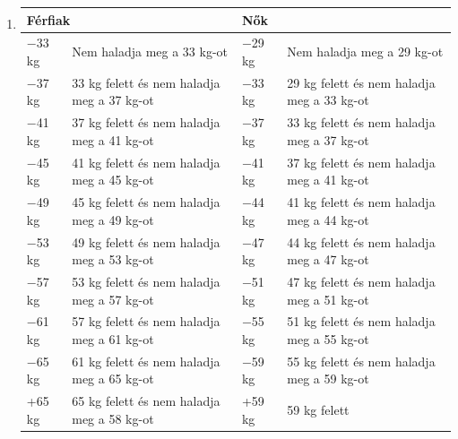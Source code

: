 \documentclass[]{report}
\begin{document}
\begin{enumerate}
\newpage
\item

\begin{center}
\begin{tabular}{ |l|l|l|l| }
 \hline
 \multicolumn{2}{|l|}{Férfiak} & \multicolumn{2}{l|}{Nők} \\
 \hline
 $-$33 kg & Nem haladja meg a 33 kg-ot & $-$29 kg & Nem haladja meg a 29 kg-ot \\
 \hline
 $-$37 kg & 33 kg felett és nem haladja meg a 37 kg-ot & $-$33 kg & 29 kg felett és nem haladja meg a 33 kg-ot \\
 \hline
 $-$41 kg & 37 kg felett és nem haladja meg a 41 kg-ot & $-$37 kg & 33 kg felett és nem haladja meg a 37 kg-ot \\
 \hline
 $-$45 kg & 41 kg felett és nem haladja meg a 45 kg-ot & $-$41 kg & 37 kg felett és nem haladja meg a 41 kg-ot \\
 \hline
 $-$49 kg & 45 kg felett és nem haladja meg a 49 kg-ot & $-$44 kg & 41 kg felett és nem haladja meg a 44 kg-ot \\
 \hline
 $-$53 kg & 49 kg felett és nem haladja meg a 53 kg-ot & $-$47 kg & 44 kg felett és nem haladja meg a 47 kg-ot \\
 \hline
 $-$57 kg & 53 kg felett és nem haladja meg a 57 kg-ot & $-$51 kg & 47 kg felett és nem haladja meg a 51 kg-ot \\
 \hline
 $-$61 kg & 57 kg felett és nem haladja meg a 61 kg-ot & $-$55 kg & 51 kg felett és nem haladja meg a 55 kg-ot \\
 \hline
 $-$65 kg & 61 kg felett és nem haladja meg a 65 kg-ot & $-$59 kg & 55 kg felett és nem haladja meg a 59 kg-ot \\
 \hline
 +65 kg & 65 kg felett és nem haladja meg a 58 kg-ot & +59 kg & 59 kg felett \\
 \hline
\end{tabular}
\end{center}

  \begin{enumerate}
  \begin{samepage}
  \item
  


\end{samepage}
\end{enumerate}
\end{enumerate}
\end{document}
